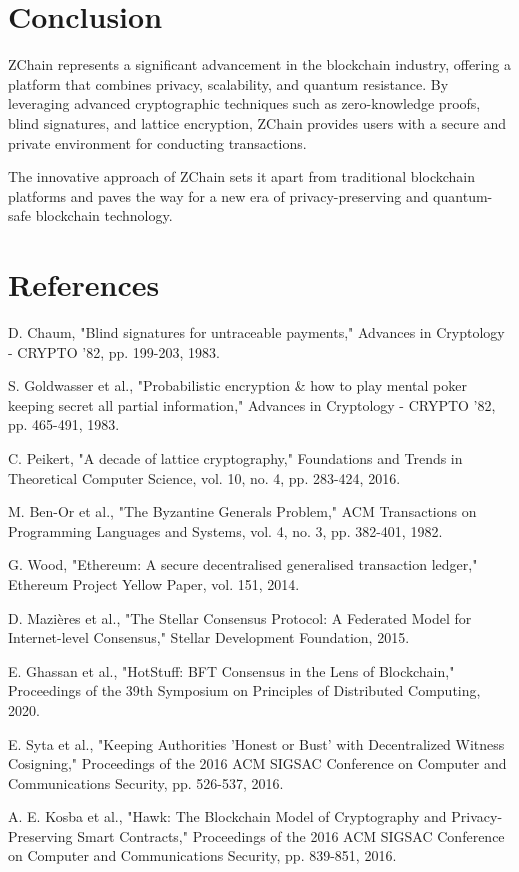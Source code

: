 \documentclass[11pt]{article}
\begin{document}
\section{Conclusion}

ZChain represents a significant advancement in the blockchain industry, offering a platform that combines privacy, scalability, and quantum resistance. By leveraging advanced cryptographic techniques such as zero-knowledge proofs, blind signatures, and lattice encryption, ZChain provides users with a secure and private environment for conducting transactions.


The innovative approach of ZChain sets it apart from traditional blockchain platforms and paves the way for a new era of privacy-preserving and quantum-safe blockchain technology.


\section{References}

D. Chaum, "Blind signatures for untraceable payments," Advances in Cryptology - CRYPTO '82, pp. 199-203, 1983.


S. Goldwasser et al., "Probabilistic encryption \& how to play mental poker keeping secret all partial information," Advances in Cryptology - CRYPTO '82, pp. 465-491, 1983.


C. Peikert, "A decade of lattice cryptography," Foundations and Trends in Theoretical Computer Science, vol. 10, no. 4, pp. 283-424, 2016.


M. Ben-Or et al., "The Byzantine Generals Problem," ACM Transactions on Programming Languages and Systems, vol. 4, no. 3, pp. 382-401, 1982.


G. Wood, "Ethereum: A secure decentralised generalised transaction ledger," Ethereum Project Yellow Paper, vol. 151, 2014.


D. Mazières et al., "The Stellar Consensus Protocol: A Federated Model for Internet-level Consensus," Stellar Development Foundation, 2015.


E. Ghassan et al., "HotStuff: BFT Consensus in the Lens of Blockchain," Proceedings of the 39th Symposium on Principles of Distributed Computing, 2020.


E. Syta et al., "Keeping Authorities 'Honest or Bust' with Decentralized Witness Cosigning," Proceedings of the 2016 ACM SIGSAC Conference on Computer and Communications Security, pp. 526-537, 2016.


A. E. Kosba et al., "Hawk: The Blockchain Model of Cryptography and Privacy-Preserving Smart Contracts," Proceedings of the 2016 ACM SIGSAC Conference on Computer and Communications Security, pp. 839-851, 2016.
\end{document}
